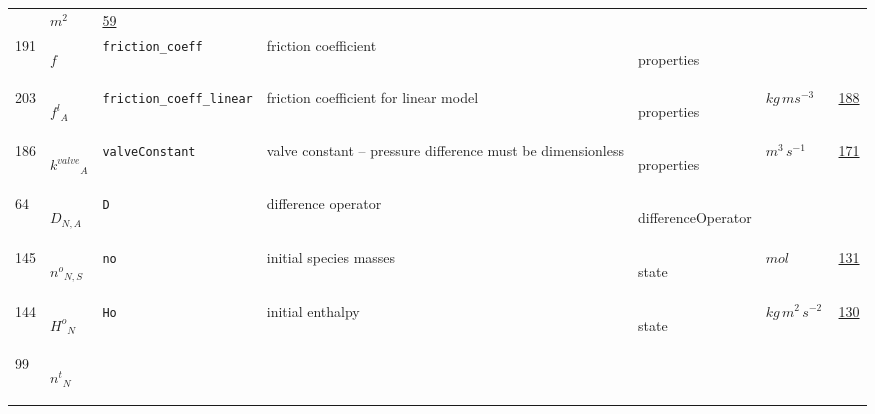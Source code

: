 \begin{longtable}{|p{1cm}|p{2.5cm}|p{4.5cm}|p{8cm}|p{3.0cm}|p{3cm}|p{1cm}|}
             & $ m^{2} \, $
             &                 \hyperlink{"e:59"}{ 59 }
                 \\
            191
             & \hypertarget{"v:191"}{ $ {{f}}{_{}} $}
             & \verb|friction_coeff|
             & friction coefficient
             & \begin{lay}properties \end{lay}
             & $  $
             & \\
            203
             & \hypertarget{"v:203"}{ $ {{f^l}}{_{A}} $}
             & \verb|friction_coeff_linear|
             & friction coefficient for linear model
             & \begin{lay}properties \end{lay}
             & $ kg \,m s^{-3} \, $
             &                 \hyperlink{"e:188"}{ 188 }
                 \\
            186
             & \hypertarget{"v:186"}{ $ {{k^{valve}}}{_{A}} $}
             & \verb|valveConstant|
             & valve constant -- pressure difference must be dimensionless
             & \begin{lay}properties \end{lay}
             & $ m^{3} \,s^{-1} \, $
             &                 \hyperlink{"e:171"}{ 171 }
                 \\
            64
             & \hypertarget{"v:64"}{ $ {D}{_{N, A}} $}
             & \verb|D|
             & difference operator
             & \begin{lay}differenceOperator \end{lay}
             & $  $
             & \\
            145
             & \hypertarget{"v:145"}{ $ {{n^o}}{_{N, S}} $}
             & \verb|no|
             & initial species masses
             & \begin{lay}state \end{lay}
             & $ mol \, $
             &                 \hyperlink{"e:131"}{ 131 }
                 \\
            144
             & \hypertarget{"v:144"}{ $ {{H^o}}{_{N}} $}
             & \verb|Ho|
             & initial enthalpy
             & \begin{lay}state \end{lay}
             & $ kg \,m^{2} \,s^{-2} \, $
             &                 \hyperlink{"e:130"}{ 130 }
                 \\
            99
             & \hypertarget{"v:99"}{ $ {{n^t}}{_{N}} $}

\end{longtable}
